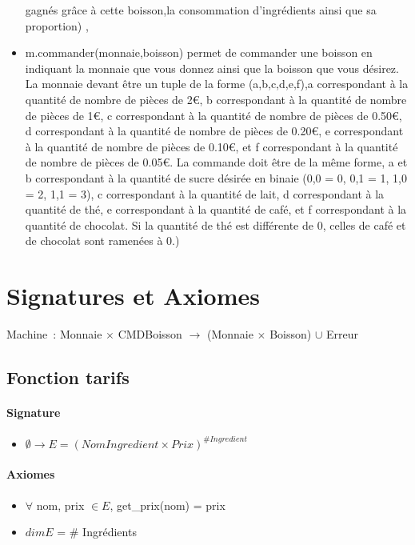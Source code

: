 \documentclass[]{article}
\newcommand{\euro}{€}
\begin{document}
\begin{itemize}
  gagnés grâce à cette boisson,la consommation d'ingrédients ainsi que
  sa proportion) ,
\item
  m.commander(monnaie,boisson) permet de commander une boisson en
  indiquant la monnaie que vous donnez ainsi que la boisson que vous
  désirez. La monnaie devant être un tuple de la forme (a,b,c,d,e,f),a
  correspondant à la quantité de nombre de pièces de 2\euro{}, b
  correspondant à la quantité de nombre de pièces de 1\euro{}, c
  correspondant à la quantité de nombre de pièces de 0.50\euro{}, d
  correspondant à la quantité de nombre de pièces de 0.20\euro{}, e
  correspondant à la quantité de nombre de pièces de 0.10\euro{}, et f
  correspondant à la quantité de nombre de pièces de 0.05\euro{}. La
  commande doit être de la même forme, a et b correspondant à la
  quantité de sucre désirée en binaie (0,0 = 0, 0,1 = 1, 1,0 = 2, 1,1 =
  3), c correspondant à la quantité de lait, d correspondant à la
  quantité de thé, e correspondant à la quantité de café, et f
  correspondant à la quantité de chocolat. Si la quantité de thé est
  différente de 0, celles de café et de chocolat sont ramenées à 0.)
\end{itemize}
\section*{Signatures et Axiomes}

Machine~: Monnaie \(\times \) CMDBoisson \(\longrightarrow \) (Monnaie \(\times \) Boisson) \(\cup \) Erreur

\subsection*{Fonction tarifs}
\paragraph{Signature}
\begin{itemize}
\item
  $\emptyset \longrightarrow  E = (NomIngredient \times Prix) ^{\#Ingredient}$
\end{itemize}
\paragraph{Axiomes}
\begin{itemize}
\item
   $\forall$ nom, prix $\in E$, get\_prix(nom) = prix 
 \item
$dim E$ = \(\#\) Ingrédients
\end{itemize}
\end{document}
